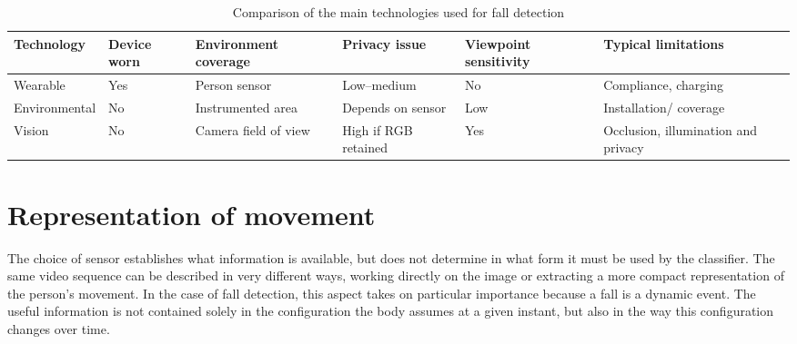 \begin{table}[htbp]
\centering
\caption{Comparison of the main technologies used for fall detection}
\label{tab:tecnologie}
\small
\renewcommand{\arraystretch}{1.3}
\setlength{\tabcolsep}{3pt}

\begin{tabular}{
|>{\centering\arraybackslash}p{2.5cm}
|>{\centering\arraybackslash}p{1.4cm}
|>{\centering\arraybackslash}p{2.5cm}
|>{\centering\arraybackslash}p{1.7cm}
|>{\centering\arraybackslash}p{2.3cm}
|>{\centering\arraybackslash}p{2.5cm}|}
\hline

\textbf{Technology} &
\textbf{Device} \newline \textbf{worn} &
\textbf{Environment} \newline \textbf{coverage} &
\textbf{Privacy} \newline \textbf{issue} &
\textbf{Viewpoint} \newline \textbf{sensitivity} &
\textbf{Typical} \newline \textbf{limitations} \\

\hline

Wearable &
Yes &
Person sensor &
Low--medium &
No &
Compliance, \newline charging \\

Environmental &
No &
Instrumented area &
Depends on sensor &
Low &
Installation/ \newline coverage \\

Vision &
No &
Camera field \newline of view &
High if RGB \newline retained &
Yes &
Occlusion, \newline illumination \newline and privacy \\

\hline
\end{tabular}
\end{table}

\section{Representation of movement}

The choice of sensor establishes what information is available, but does not determine in what form it must be used by the classifier. The same video sequence can be described in very different ways, working directly on the image or extracting a more compact representation of the person's movement.
In the case of fall detection, this aspect takes on particular importance because a fall is a dynamic event. The useful information is not contained solely in the configuration the body assumes at a given instant, but also in the way this configuration changes over time.


